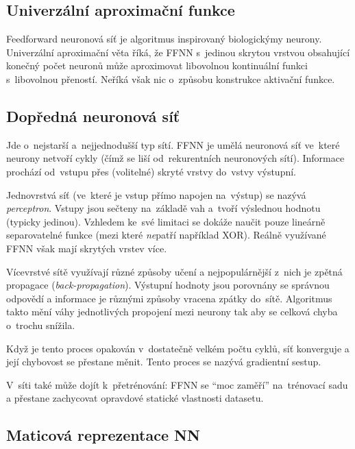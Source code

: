 \subsection{Univerzální aproximační funkce}

Feedforward neuronová síť je algoritmus inspirovaný biologickýmy neurony.
Univerzální aproximační věta říká, že FFNN s~jedinou skrytou vrstvou obsahující konečný počet neuronů může aproximovat libovolnou kontinuální funkci s~libovolnou přeností.
Neříká však nic o~způsobu konstrukce aktivační funkce.

\subsection{Dopředná neuronová síť}

Jde o~nejstarší a~nejjednodušší typ sítí.
FFNN je umělá neuronová síť ve~které neurony netvoří cykly (čímž se liší od~rekurentních neuronových sítí).
Informace prochází od~vstupu přes (volitelné) skryté vrstvy do~vstvy výstupní.

Jednovrstvá síť (ve~které je vstup přímo napojen na~výstup) se nazývá \emph{perceptron}.
Vstupy jsou sečteny na~základě vah a~tvoří výslednou hodnotu (typicky jedinou).
Vzhledem ke~své limitaci se dokáže naučit pouze lineárně separovatelné funkce (mezi které \emph{ne}patří například XOR).
Reálně využívané FFNN však mají skrytých vrstev více.

Vícevrstvé sítě využívají různé způsoby učení a nejpopulárnější z~nich je zpětná propagace (\emph{back-propagation}).
Výstupní hodnoty jsou porovnány se správnou odpovědí a informace je různými způsoby vracena zpátky do~sítě.
Algoritmus takto mění váhy jednotlivých propojení mezi neurony tak aby se celková chyba o~trochu snížila.

Když je tento proces opakován v~dostatečně velkém počtu cyklů, síť konverguje a její chybovost se přestane měnit.
Tento proces se nazývá gradientní sestup.

V~síti také může dojít k~přetrénování: FFNN se \enquote{moc zaměří} na~trénovací sadu a přestane zachycovat opravdové statické vlastnosti datasetu.

\subsection{Maticová reprezentace NN}

